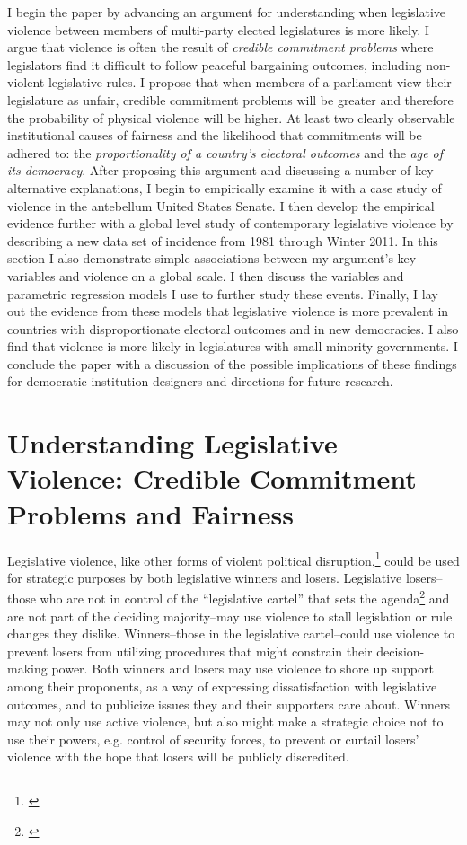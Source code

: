 \documentclass[a4paper]{article}\usepackage[]{graphicx}\usepackage[]{color}
\begin{document}
I begin the paper by advancing an argument for understanding when legislative violence between members of multi-party elected legislatures is more likely. I argue that violence is often the result of \emph{credible commitment problems} where legislators find it difficult to follow peaceful bargaining outcomes, including non-violent legislative rules. I propose that when members of a parliament view their legislature as unfair, credible commitment problems will be greater and therefore the probability of physical violence will be higher. At least two clearly observable institutional causes of fairness and the likelihood that commitments will be adhered to: the \emph{proportionality of a country's electoral outcomes} and the \emph{age of its democracy}. After proposing this argument and discussing a number of key alternative explanations, I begin to empirically examine it with a case study of violence in the antebellum United States Senate. I then develop the empirical evidence further with a global level study of contemporary legislative violence by describing a new data set of incidence from 1981 through Winter 2011. In this section I also demonstrate simple associations between my argument's key variables and violence on a global scale. I then discuss the variables and parametric regression models I use to further study these events. Finally, I lay out the evidence from these models that legislative violence is more prevalent in countries with disproportionate electoral outcomes and in new democracies. I also find that violence is more likely in legislatures with small minority governments. I conclude the paper with a discussion of the possible implications of these findings for democratic institution designers and directions for future research.


\section{Understanding Legislative Violence: Credible Commitment Problems and Fairness}

Legislative violence, like other forms of violent political disruption,\footnote{\citealt{Beaulieu2008,BeaulieuForthcoming,wilkinson2006}} could be used for strategic purposes by both legislative winners and losers. Legislative losers--those who are not in control of the ``legislative cartel''  that sets the agenda\footnote{\citealt{cox2007}} and are not part of the deciding majority--may use violence to stall legislation or rule changes they dislike. Winners--those in the legislative cartel--could use violence to prevent losers from utilizing procedures that might constrain their decision-making power. Both winners and losers may use violence to shore up support among their proponents, as a way of expressing dissatisfaction with legislative outcomes, and to publicize issues they and their supporters care about. Winners may not only use active violence, but also might make a strategic choice not to use their powers, e.g. control of security forces, to prevent or curtail losers' violence with the hope that losers will be publicly discredited. 
\end{document}

